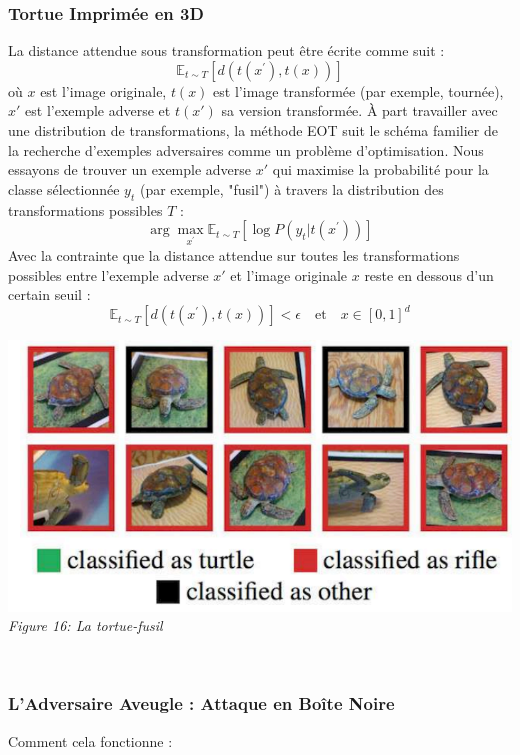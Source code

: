 \subsubsection{Tortue Imprimée en 3D}
La distance attendue sous transformation peut être écrite comme suit :
\[
\mathbb{E}_{t\sim{}T}[d(t(x^\prime),t(x))]
\]
où \( x \) est l'image originale, \( t(x) \) est l'image transformée (par exemple, tournée), \( x' \) est l'exemple adverse et \( t(x') \) sa version transformée.
À part travailler avec une distribution de transformations, la méthode EOT suit le schéma familier de la recherche d'exemples adversaires comme un problème d'optimisation.
Nous essayons de trouver un exemple adverse \( x' \) qui maximise la probabilité pour la classe sélectionnée \( y_t \) (par exemple, "fusil") à travers la distribution des transformations possibles \( T \) :
\[
\arg\max_{x^\prime}\mathbb{E}_{t\sim{}T}[\log{}P(y_t|t(x^\prime))]
\]
Avec la contrainte que la distance attendue sur toutes les transformations possibles entre l'exemple adverse \( x' \) et l'image originale \( x \) reste en dessous d'un certain seuil :
\[
\mathbb{E}_{t\sim{}T}[d(t(x^\prime),t(x))]<\epsilon\quad\text{et}\quad{}x\in[0,1]^d
\]

\begin{center}
    \centering
    \includegraphics[width=0.7\linewidth]{Images/tortue.png}
    \\
    \emph{Figure 16: La tortue-fusil }
    \\
\end{center}
\\

\subsubsection{L'Adversaire Aveugle : Attaque en Boîte Noire}
Comment cela fonctionne :

